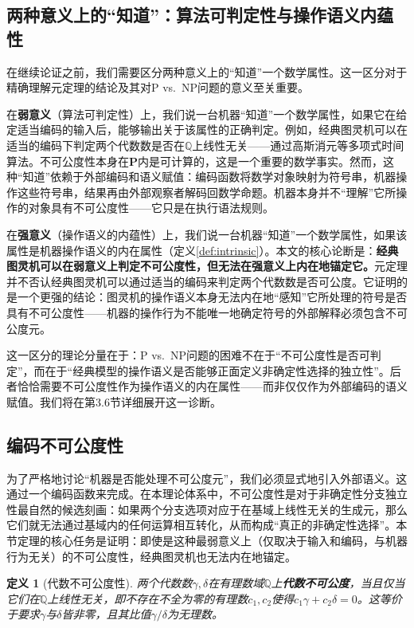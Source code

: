 \documentclass{ctexart}
\newtheorem{definition}[theorem]{定义}
\begin{document}
	\subsection{两种意义上的``知道''：算法可判定性与操作语义内蕴性}
	
	在继续论证之前，我们需要区分两种意义上的``知道''一个数学属性。这一区分对于精确理解元定理的结论及其对P vs.\ NP问题的意义至关重要。
	
	在\textbf{弱意义}（算法可判定性）上，我们说一台机器``知道''一个数学属性，如果它在给定适当编码的输入后，能够输出关于该属性的正确判定。例如，经典图灵机可以在适当的编码下判定两个代数数是否在$\mathbb{Q}$上线性无关——通过高斯消元等多项式时间算法。不可公度性本身在$\mathbf{P}$内是可计算的，这是一个重要的数学事实。然而，这种``知道''依赖于外部编码和语义赋值：编码函数将数学对象映射为符号串，机器操作这些符号串，结果再由外部观察者解码回数学命题。机器本身并不``理解''它所操作的对象具有不可公度性——它只是在执行语法规则。
	
	在\textbf{强意义}（操作语义的内蕴性）上，我们说一台机器``知道''一个数学属性，如果该属性是机器操作语义的内在属性（定义\ref{def:intrinsic}）。本文的核心论断是：\textbf{经典图灵机可以在弱意义上判定不可公度性，但无法在强意义上内在地锚定它。}元定理并不否认经典图灵机可以通过适当的编码来判定两个代数数是否可公度。它证明的是一个更强的结论：图灵机的操作语义本身无法内在地``感知''它所处理的符号是否具有不可公度性——机器的操作行为不能唯一地确定符号的外部解释必须包含不可公度元。
	
	这一区分的理论分量在于：P vs.\ NP问题的困难不在于``不可公度性是否可判定''，而在于``经典模型的操作语义是否能够正面定义非确定性选择的独立性''。后者恰恰需要不可公度性作为操作语义的内在属性——而非仅仅作为外部编码的语义赋值。我们将在第3.6节详细展开这一诊断。
	
	\subsection{编码不可公度性}
	
	为了严格地讨论``机器是否能处理不可公度元''，我们必须显式地引入外部语义。这通过一个编码函数来完成。在本理论体系中，不可公度性是对于非确定性分支独立性最自然的候选刻画：如果两个分支选项对应于在基域上线性无关的生成元，那么它们就无法通过基域内的任何运算相互转化，从而构成``真正的非确定性选择''。本节定理的核心任务是证明：即使是这种最弱意义上（仅取决于输入和编码，与机器行为无关）的不可公度性，经典图灵机也无法内在地锚定。
	
	\begin{definition}[代数不可公度性]\label{def:algebraic-incomm}
		两个代数数$\gamma, \delta$在有理数域$\mathbb{Q}$上\textbf{代数不可公度}，当且仅当它们在$\mathbb{Q}$上线性无关，即不存在不全为零的有理数$c_1, c_2$使得$c_1\gamma + c_2\delta = 0$。这等价于要求$\gamma$与$\delta$皆非零，且其比值$\gamma/\delta$为无理数。
	\end{definition}
	
\end{document}
